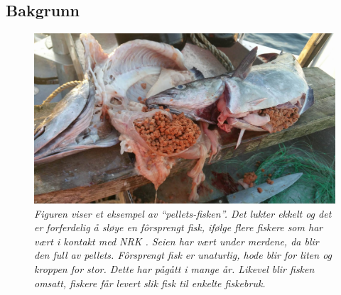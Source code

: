 

\subsection{Bakgrunn}

\begin{figure} 
\begin{center} 
\includegraphics[scale=0.2]{figures/oppdrettfor}
\caption{\small \sl Figuren viser et eksempel av ``pellets-fisken''. Det lukter ekkelt og det er forferdelig å sløye en fôrsprengt fisk, ifølge flere fiskere som har vært i kontakt med NRK \cite{Trana m.fl. 2019}. Seien har vært under merdene, da blir den full av pellets. Fôrsprengt fisk er unaturlig, hode blir for liten og kroppen for stor. Dette har pågått i mange år. Likevel blir fisken omsatt, fiskere får levert slik fisk til enkelte fiskebruk. \cite{Angell og Ekanger 2017} \label{fig:oppdrettfor}} 
\end{center} 
\end{figure} 


